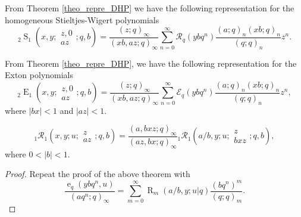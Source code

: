 \documentclass{cimart}
\newcommand{\EE}{\mathcal{E}}
\newcommand{\rbhs}{\mathcal{R}}
\newcommand{\RR}{\mathcal{R}}
\DeclareMathOperator{\ope}{e}
\DeclareMathOperator{\opE}{E}
\DeclareMathOperator{\opR}{R}
\DeclareMathOperator{\opS}{S}
\begin{document}
\begin{corollary}
From  Theorem \ref{theo_repre_DHP} we have the following representation for the homogeneous Stieltjes-Wigert polynomials
    \begin{equation}
        {}_{2}\opS_{1}\left(x,y;
        \begin{array}{c}
             z,0 \\
             az
        \end{array};
        q,b
        \right)=\frac{(z;q)_{\infty}}{(xb,az;q)_{\infty}}\sum_{n=0}^{\infty}\RR_{q}(ybq^n)\frac{(a;q)_{n}(xb;q)_{n}}{(q;q)_{n}}z^n.
    \end{equation}
\end{corollary}
\begin{corollary}
From  Theorem \ref{theo_repre_DHP}, we have the following representation for the Exton polynomials
    \begin{equation}
        {}_{2}\opE_{1}\left(x,y;
        \begin{array}{c}
             z,0 \\
             az
        \end{array};
        q,b
        \right)=\frac{(z;q)_{\infty}}{(xb,az;q)_{\infty}}\sum_{n=0}^{\infty}\EE_{q}(ybq^n)\frac{(a;q)_{n}(xb;q)_{n}}{(q;q)_{n}}z^n,
    \end{equation}
where $\vert bx\vert<1$ and $\vert az\vert<1$.
\end{corollary}


\begin{theorem}\label{theo_heine}
    \begin{equation}
        {}_{1}\rbhs_{1}\left(x,y;u;
        \begin{array}{c}
             z \\
             az
        \end{array};
        q,b
        \right)=\frac{(a,bxz;q)_{\infty}}{(az,bx;q)_{\infty}}{}_{1}\rbhs_{1}\left(a/b,y;u;
        \begin{array}{c}
             z \\
             bxz
        \end{array};
        q,b
        \right),
    \end{equation}
where $0<\vert b\vert<1$.    
\end{theorem}
\begin{proof}
Repeat the proof of the above theorem with
\begin{equation}
    \frac{\ope_{q}(ybq^n,u)}{(aq^n;q)_{\infty}}=\sum_{m=0}^{\infty}\opR_{m}(a/b,y;u|q)\frac{(bq^{n})^m}{(q;q)_{m}}.
\end{equation}
\end{proof}
\end{document}
